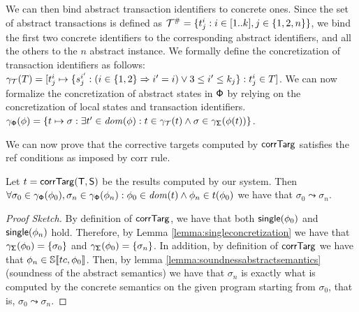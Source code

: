 We can then bind abstract transaction identifiers to concrete ones. Since the set of abstract transactions is defined as $\abstracttransactions = \{t^i_j : i \in [1..k], j \in \{1, 2, n\}\}$, we bind the first two concrete identifiers to the corresponding abstract identifiers, and all the others to the $n$ abstract instance. We formally define the concretization of transaction identifiers as follows:
$
\gamma_{\concretetransactions}(T) =
[
t^i_j \mapsto 
\{
s^{i'}_j : (i \in \{1, 2\} \Rightarrow i'=i) \lor 3\leq i' \leq k_j
\} : t^i_j \in T
]
$.
We can now formalize the concretization of abstract states in $\mathsf{\mathsf{\Phi}}$ by relying on the concretization of local states and transaction identifiers.
%
$
\gamma_\multistate(\phi) = \{t \mapsto \sigma : \exists t' \in \dom{\phi} : t \in \gamma_{\concretetransactions}(t) \land \sigma \in \gamma_{\state}(\phi(t))\}
$.
\normalsize

We can now prove that the corrective targets computed by $\mathsf{corrTarg}$ satisfies the {\sf ref} conditions as imposed by {\sf corr} rule.

\begin{theorem}
	Let $t=\mathsf{corrTarg}(\mathsf{T}, \mathsf{S})$ be the results computed by our system. Then $\forall \sigma_0 \in \gamma_{\mathsf{\Phi}}(\phi_0), \sigma_n \in \gamma_{\mathsf{\Phi}}(\phi_n) : \phi_0 \in \mathit{dom}(t) \land \phi_n \in t(\phi_0)$ we have that $\sigma_0 \leadsto \sigma_n$.
\end{theorem}
\begin{proof}[Proof Sketch]
By definition of $\mathsf{corrTarg}$, we have that both $\mathsf{single}(\phi_0)$ and $\mathsf{single}(\phi_n)$ hold. Therefore, by Lemma \ref{lemma:singleconcretization} we have that $\gamma_{\mathsf{\Sigma}}(\phi_0) = \{\sigma_0\}$ and $\gamma_{\mathsf{\Sigma}}(\phi_0) = \{\sigma_n\}$. In addition, by definition of $\mathsf{corrTarg}$ we have that $\phi_n \in \mathbb{S}\llbracket tc, \phi_0 \rrbracket$. Then, by lemma \ref{lemma:soundnessabstractsemantics} (soundness of the abstract semantics) we have that $\sigma_n$ is exactly what is computed by the concrete semantics on the given program starting from $\sigma_0$, that is, $\sigma_0 \leadsto \sigma_n$. 
\end{proof}



